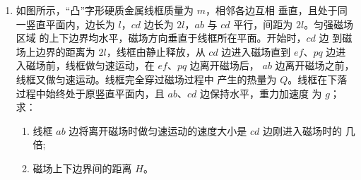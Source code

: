\begin{enumerate}


\item 
{}
如图所示，“凸”字形硬质金属线框质量为 $ m $，相邻各边互相
垂直，且处于同一竖直平面内，边长为 $ l $，$ cd $ 边长为 $ 2l $，$ ab $ 与 $ cd $ 平行，间距为 $ 2l $。匀强磁场区域
的上下边界均水平，磁场方向垂直于线框所在平面。开始时，$ cd $ 边
到磁场上边界的距离为 $ 2l $，线框由静止释放，从 $ cd $ 边进入磁场直到
$ ef $、$ pq $ 边进入磁场前，线框做匀速运动，在 $ ef $、$ pq $ 边离开磁场后，
$ ab $ 边离开磁场之前，线框又做匀速运动。线框完全穿过磁场过程中
产生的热量为 $ Q $。线框在下落过程中始终处于原竖直平面内，且 $ ab $、$ cd $ 边保持水平，重力加速度
为 $ g $；求：
\begin{enumerate}
\item
线框 $ ab $ 边将离开磁场时做匀速运动的速度大小是 $ cd $ 边刚进入磁场时的 几倍;
\item 
磁场上下边界间的距离 $ H $。

\end{enumerate}
\begin{figure}[h!]
\flushright

\end{figure}



\end{enumerate}
